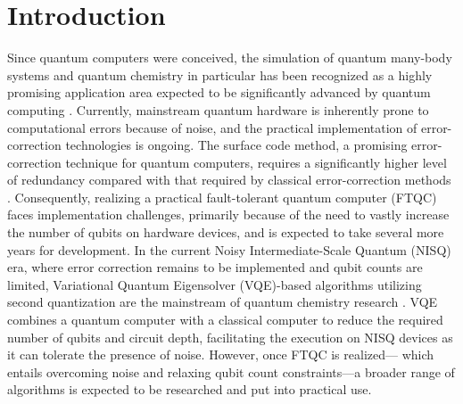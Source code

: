 \documentclass[manuscript_main.tex]{subfiles}
\begin{document}
\section{Introduction}
Since quantum computers were conceived, the simulation of quantum many-body
systems and quantum chemistry in particular has been recognized as a highly
promising application area expected to be significantly advanced by quantum
computing \cite{Cao2019.doi:10.1021/acs.chemrev.8b00803}.
Currently, mainstream quantum hardware is inherently prone to computational
errors because of noise, and the practical implementation of error-correction
technologies is ongoing. The surface code method, a promising error-correction
technique for quantum computers, requires a significantly higher level of
redundancy compared with that required by classical error-correction methods
\cite{Fowler2012.PhysRevA.86.032324}. Consequently, realizing a practical
fault-tolerant quantum computer (FTQC) faces implementation challenges,
primarily because of the need to vastly increase the number of qubits on
hardware devices, and is expected to take several more years for development. In
the current Noisy Intermediate-Scale Quantum (NISQ) era, where error correction
remains to be implemented and qubit counts are limited, Variational Quantum
Eigensolver (VQE)-based algorithms utilizing second quantization are the
mainstream of quantum chemistry research \cite{peruzzo2014variational}. VQE
combines a quantum computer with a classical computer to reduce the required
number of qubits and circuit depth, facilitating the execution on NISQ devices
as it can tolerate the presence of noise. However, once FTQC is realized---
which entails overcoming noise  and relaxing qubit count constraints---a broader
range of algorithms is expected to be researched and put into practical use.
\end{document}
